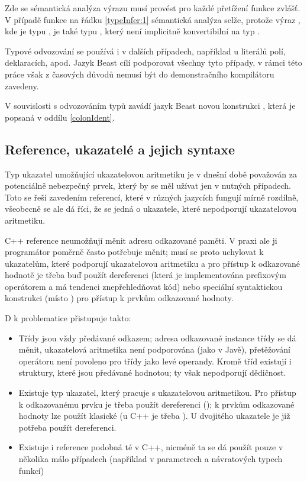 Zde se sémantická analýza výrazu  musí provést pro každé přetížení funkce  zvlášť. V případě funkce na řádku \ref{typeInfer:1} sémantická analýza selže, protože výraz , kde  je typu , je také typu , který není implicitně konvertibilní na typ .

Typové odvozování se používá i v dalších případech, například u literálů polí,  deklaracích, apod. Jazyk Beast cílí podporovat všechny tyto případy, v rámci této práce však z časových důvodů nemusí být do demonstračního kompilátoru zavedeny.

V souvislosti s odvozováním typů zavádí jazyk Beast novou konstrukci , která je popsaná v oddílu \ref{colonIdent}.

\subsection{Reference, ukazatelé a jejich syntaxe} \label{pointers}
Typ ukazatel umožňující ukazatelovou aritmetiku je v dnešní době považován za potenciálně nebezpečný prvek, který by se měl užívat jen v nutných případech. Toto se řeší zavedením referencí, které v různých jazycích fungují mírně rozdílně, všeobecně se ale dá říci, že se jedná o ukazatele, které nepodporují ukazatelovou aritmetiku.

C++ reference neumožňují měnit adresu odkazované paměti. V praxi ale ji programátor poměrně často potřebuje měnit; musí se proto uchylovat k ukazatelům, které podporují ukazatelovou aritmetiku a pro přístup k odkazované hodnotě je třeba buď použít dereferenci (která je implementována prefixovým operátorem  a má tendenci znepřehledňovat kód) nebo speciální syntaktickou konstrukci (místo  ) pro přístup k prvkům odkazované hodnoty.

D k problematice přistupuje takto:
\begin{itemize}
	\item Třídy jsou vždy předávané odkazem; adresa odkazované instance třídy se dá měnit, ukazatelová aritmetika není podporována (jako v Javě), přetěžování operátoru  není povoleno pro třídy jako levé operandy. Kromě tříd existují i struktury, které jsou předávané hodnotou; ty však nepodporují dědičnost.
	\item Existuje typ ukazatel, který pracuje s ukazatelovou aritmetikou. Pro přístup k odkazovanému prvku je třeba použít dereferenci (); k prvkům odkazované hodnoty lze použít klasické  (u C++ je třeba ). U dvojitého ukazatele je již potřeba použít dereferenci.
	\item Existuje i reference podobná té v C++, nicméně ta se dá použít pouze v několika málo případech (například v parametrech a návratových typech funkcí)
\end{itemize}


